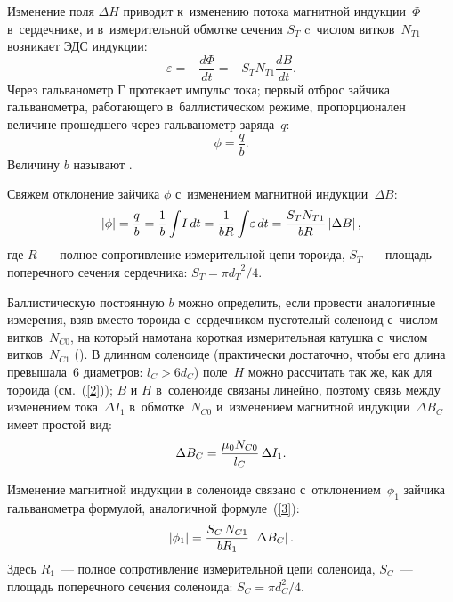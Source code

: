 Изменение поля $\Delta H$ приводит к~изменению потока магнитной индукции~$\Phi$ в~сердечнике, и в~измерительной обмотке
сечения $S_T$ c~числом витков~$N_{T1}$ возникает ЭДС индукции:
\begin{equation*}
	\varepsilon=-\frac{d\Phi}{dt}=-S_T N_{T1}\frac{dB}{dt}.
\end{equation*}
Через гальванометр Г протекает импульс тока; первый отброс зайчика гальванометра, работающего в~баллистическом режиме,
пропорционален величине прошедшего через гальванометр заряда~$q$:
\begin{equation*}
	\phi=\frac{q}{b}.
\end{equation*}
Величину $b$ называют .

Свяжем отклонение зайчика $\phi$ с~изменением магнитной индукции~$\Delta B$:
\begin{equation}
	\eqmark{3}
	|\phi|=\frac{q}{b}=\frac{1}{b}\int\! I\,dt= \frac{1}{bR}\int\! \varepsilon\,dt=\frac{S_T N_{T1}}{bR}\left| \Delta B \right|,
\end{equation}
где $R$~--- полное сопротивление измерительной цепи тороида, $S_T$~--- площадь поперечного сечения сердечника: $S_T=\pi
{d_T}^2/4$.

Баллистическую постоянную $b$ можно определить, если провести аналогичные измерения, взяв вместо тороида с~сердечником
пустотелый соленоид с~числом витков~$N_{C0}$, на который намотана короткая измерительная катушка с~числом
витков~$N_{C1}$ (). В длинном соленоиде (практически достаточно, чтобы его длина превышала~6 диаметров: $l_C >
6d_C$) поле~$H$ можно рассчитать так же, как для тороида (см.~(\eqref{2})); $B$ и $H$ в~соленоиде связаны линейно, поэтому
связь между изменением тока~$\Delta I_1$ в~обмотке~$N_{C0}$ и~изменением магнитной индукции~$\Delta B_C$ имеет простой вид:
\begin{equation}%
	\eqmark{4}
	\Delta B_C=\frac{\mu_0 N_{C0}}{l_C}\,\Delta I_1.
\end{equation}

Изменение магнитной индукции в соленоиде связано с~отклонением~$\phi_1$ зайчика гальванометра формулой, аналогичной
формуле~(\eqref{3}):
\begin{equation}%
	\eqmark{5}
	\left| \phi_1 \right|=\frac{S_C\,N_{C1}}{bR_1}\,\left|\Delta B_C \right|.
\end{equation}
Здесь $R_1$~--- полное сопротивление измерительной цепи соленоида, $S_C$~--- площадь поперечного сечения соленоида:
$S_C=\pi d^2_C/4$.

